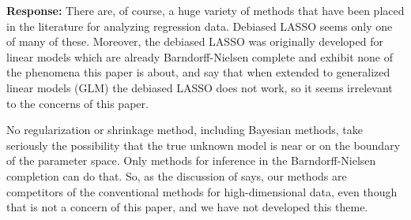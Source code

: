 \documentclass[12pt]{article}
\begin{document}
{\bf Response:} There are, of course, a huge variety of methods that have been placed in
the literature for analyzing regression data.  Debiased LASSO seems only
one of many of these.  Moreover, the debiased LASSO was originally developed
for linear models which are already Barndorff-Nielsen complete and exhibit
none of the phenomena this paper is about, and \citet{xia-nan-li} say that 
when extended to generalized linear models (GLM) the debiased LASSO does
not work, so it seems irrelevant to the concerns of this paper. \\

\begin{sloppypar}
No regularization or shrinkage method, including Bayesian methods,
take seriously the possibility that
the true unknown model is near or on the boundary of the parameter space.
Only methods for inference in the Barndorff-Nielsen completion can do that.
So, as the discussion of \citet{geyer-gdor} says,
our methods are competitors of the conventional methods for high-dimensional
data, even though that is not a concern of this paper, and we have not
developed this theme.
\end{sloppypar}




\end{document}
